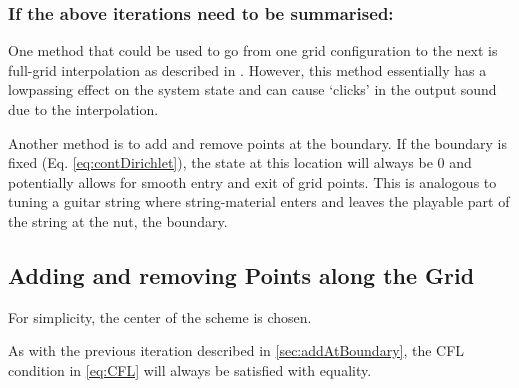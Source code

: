 \documentclass[dvipsnames, preprint]{JASA}
\def\SWcomment[#1]{\textcolor{Bittersweet}{#1}}
\begin{document}
\subsubsection{\SWcomment[If the above iterations need to be summarised:]}
One method that could be used to go from one grid configuration to the next is full-grid interpolation as described in \cite[Chap. 5]{bilbao2009}. However, this method essentially has a lowpassing effect on the system state and can cause `clicks' in the output sound due to the interpolation. 

Another method is to add and remove points at the boundary. If the boundary is fixed (Eq. \eqref{eq:contDirichlet}), the state at this location will always be $0$ and potentially allows for smooth entry and exit of grid points. This is analogous to tuning a guitar string where string-material enters and leaves the playable part of the string at the nut, the boundary. 

\subsection{Adding and removing Points along the Grid}


For simplicity, the center of the scheme is chosen.


As with the previous iteration described in \ref{sec:addAtBoundary}, the CFL condition in \eqref{eq:CFL} will always be satisfied with equality.


\end{document}
